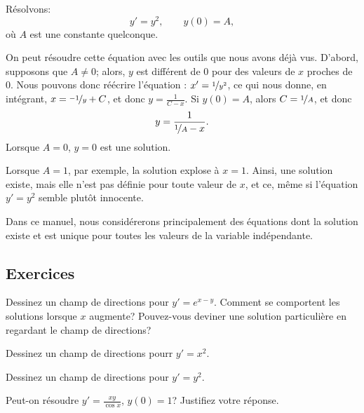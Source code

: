 \begin{example}
	Résolvons:
	\begin{equation*}
		y' = y^2, \qquad y(0) = A,
	\end{equation*}
	où $A$ est une constante quelconque.

	On peut résoudre cette équation avec les outils que nous avons déjà vus.
	D'abord, supposons que $A \not= 0$;
	alors, $y$ est différent de 0 pour des valeurs de $x$ proches de 0.
	Nous pouvons donc réécrire l'équation :
		$x' = \nicefrac{1}{y^2}$, ce qui nous donne, en intégrant,
		$x = \nicefrac{-1}{y} + C$, et donc $y = \frac{1}{C-x}$.  Si $y(0) = A$, alors
		$C = \nicefrac{1}{A}$, et donc
	\begin{equation*}
		y = \frac{1}{\nicefrac{1}{A} - x} .
	\end{equation*}
	Lorsque $A=0$,  $y=0$ est une solution.

	Lorsque $A=1$, par exemple, la solution \og{}explose\fg{} à  $x=1$.
	Ainsi, une solution existe, mais elle n'est pas définie pour toute valeur de $x$,
	et ce, même si l'équation $y' = y^2$ semble plutôt innocente.
\end{example}

Dans ce manuel, nous considérerons principalement des équations dont la solution existe
et est unique pour toutes les valeurs de la variable indépendante.


\subsection{Exercices}

\begin{exercise}
	Dessinez un champ de directions pour $y'=e^{x-y}$.
	Comment se comportent les solutions lorsque $x$ augmente?
	Pouvez-vous deviner une solution particulière en regardant le champ de directions?
\end{exercise}

\begin{exercise}
	Dessinez un champ de directions pourr $y'=x^2$.
\end{exercise}

\begin{exercise}
	Dessinez un champ de directions pour $y'=y^2$.
\end{exercise}

\begin{exercise}
	Peut-on résoudre $y' = \frac{xy}{\cos x}$, $y(0) = 1$?
	Justifiez votre réponse.
\end{exercise}

